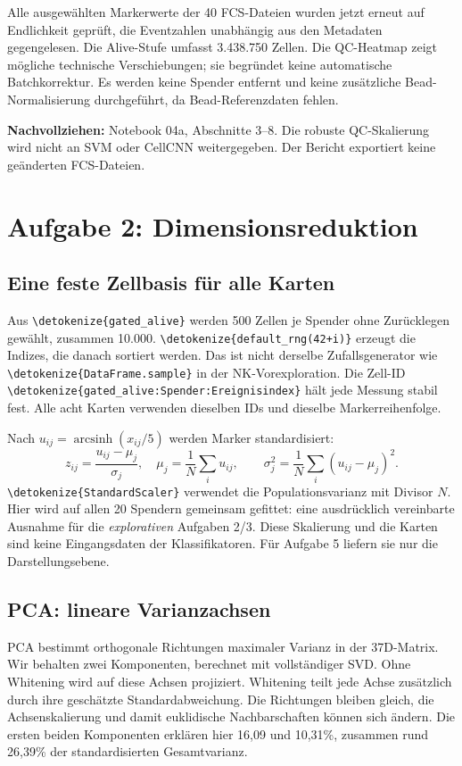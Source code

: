 \documentclass[11pt,a4paper]{article}
\newcommand{\code}[1]{\expandafter\nolinkurl\expandafter{\detokenize{#1}}}
\newcommand{\source}[1]{\par{\footnotesize\raggedright\color{muted}\textbf{Nachvollziehen:} #1\par}}
\begin{document}
Alle ausgewählten Markerwerte der 40 FCS-Dateien wurden jetzt erneut auf
Endlichkeit geprüft, die Eventzahlen unabhängig aus den Metadaten
gegengelesen. Die Alive-Stufe umfasst 3.438.750 Zellen. Die QC-Heatmap zeigt
mögliche technische Verschiebungen; sie begründet keine automatische
Batchkorrektur. Es werden keine Spender entfernt und keine zusätzliche
Bead-Normalisierung durchgeführt, da Bead-Referenzdaten fehlen.
\source{Notebook 04a, Abschnitte 3--8. Die robuste QC-Skalierung wird nicht an
SVM oder CellCNN weitergegeben. Der Bericht exportiert keine geänderten FCS-Dateien.}

\clearpage
\section{Aufgabe 2: Dimensionsreduktion}\label{sec:task2}
\subsection*{Eine feste Zellbasis für alle Karten}
Aus \code{gated_alive} werden 500 Zellen je Spender ohne Zurücklegen gewählt,
zusammen 10.000. \code{default_rng(42+i)} erzeugt die Indizes, die danach
sortiert werden. Das ist nicht derselbe Zufallsgenerator wie
\code{DataFrame.sample} in der NK-Vorexploration. Die Zell-ID
\code{gated_alive:Spender:Ereignisindex} hält jede Messung stabil fest.
Alle acht Karten verwenden dieselben IDs und dieselbe Markerreihenfolge.

Nach \(u_{ij}=\operatorname{arcsinh}(x_{ij}/5)\) werden Marker standardisiert:
\[
 z_{ij}=\frac{u_{ij}-\mu_j}{\sigma_j},\quad
 \mu_j=\frac1N\sum_i u_{ij},\qquad
 \sigma_j^2=\frac1N\sum_i(u_{ij}-\mu_j)^2.
\]
\code{StandardScaler} verwendet die Populationsvarianz mit Divisor \(N\).
Hier wird auf allen 20 Spendern gemeinsam gefittet: eine ausdrücklich
vereinbarte Ausnahme für die \emph{explorativen} Aufgaben 2/3. Diese
Skalierung und die Karten sind keine Eingangsdaten der Klassifikatoren.
Für Aufgabe 5 liefern sie nur die Darstellungsebene.

\subsection*{PCA: lineare Varianzachsen}
PCA bestimmt orthogonale Richtungen maximaler Varianz in der 37D-Matrix.
Wir behalten zwei Komponenten, berechnet mit vollständiger SVD. Ohne
Whitening wird auf diese Achsen projiziert. Whitening teilt jede Achse
zusätzlich durch ihre geschätzte Standardabweichung. Die Richtungen bleiben
gleich, die Achsenskalierung und damit euklidische Nachbarschaften können
sich ändern. Die ersten beiden Komponenten erklären hier 16,09 und
10,31\%, zusammen rund 26,39\% der standardisierten Gesamtvarianz.
\end{document}

